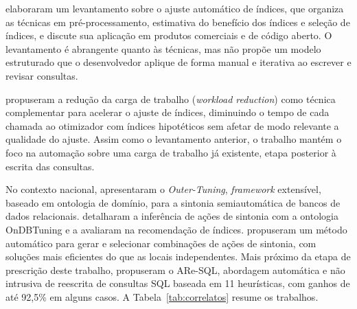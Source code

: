  elaboraram um levantamento sobre o ajuste automático de índices, que organiza as técnicas em pré-processamento, estimativa do benefício dos índices e seleção de índices, e discute sua aplicação em produtos comerciais e de código aberto. O levantamento é abrangente quanto às técnicas, mas não propõe um modelo estruturado que o desenvolvedor aplique de forma manual e iterativa ao escrever e revisar consultas.

 propuseram a redução da carga de trabalho (\textit{workload reduction}) como técnica complementar para acelerar o ajuste de índices, diminuindo o tempo de cada chamada ao otimizador com índices hipotéticos sem afetar de modo relevante a qualidade do ajuste. Assim como o levantamento anterior, o trabalho mantém o foco na automação sobre uma carga de trabalho já existente, etapa posterior à escrita das consultas. 

No contexto nacional,  apresentaram o \textit{Outer-Tuning}, \textit{framework} extensível, baseado em ontologia de domínio, para a sintonia semiautomática de bancos de dados relacionais.  detalharam a inferência de ações de sintonia com a ontologia OnDBTuning e a avaliaram na recomendação de índices.  propuseram um método automático para gerar e selecionar combinações de ações de sintonia, com soluções mais eficientes do que as locais independentes. Mais próximo da etapa de prescrição deste trabalho,  propuseram o ARe-SQL, abordagem automática e não intrusiva de reescrita de consultas SQL baseada em 11 heurísticas, com ganhos de até 92,5\% em alguns casos. A Tabela~\ref{tab:correlatos} resume os trabalhos.

